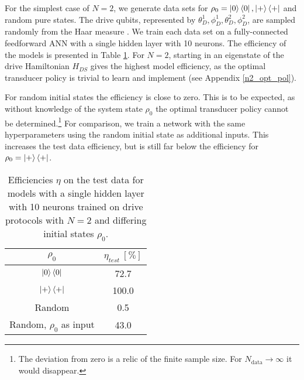 For the simplest case of $N = 2$, we generate data sets for $\rho_0 = \ket{0} \bra{0}, \ket{+} \bra{+}$ and random pure states.
The drive qubits, represented by $\theta_D^1, \phi_D^1, \theta_D^2, \phi_D^2$, are sampled randomly from the Haar measure \cite{Mezzadri}.
We train each data set on a fully-connected feedforward ANN with a single hidden layer with 10 neurons.
The efficiency of the models is presented in Table \ref{n2efftable}.
For $N = 2$, starting in an eigenstate of the drive Hamiltonian $H_{DS}$ gives the highest model efficiency, as the optimal transducer policy is trivial to learn and implement (see Appendix \ref{n2_opt_pol}).

For random initial states the efficiency is close to zero.
This is to be expected, as without knowledge of the system state $\rho_0$ the optimal transducer policy cannot be determined.\footnote{The deviation from zero is a relic of the finite sample size. For $N_{\mathrm{data}} \to \infty$ it would disappear.}
For comparison, we train a network with the same hyperparameters using the random initial state as additional inputs.
This increases the test data efficiency, but is still far below the efficiency for $\rho_0 = \ket{+} \bra{+}$.


\begin{table}[h]
	\centering
	\begin{tabular}{ c | c }
		$\rho_0$ & $\eta_{test} \ [\%]$ \\
		\hline
		$\ket{0} \bra{0}$ & 72.7 \\
		$\ket{+} \bra{+}$ & 100.0 \\
		Random & 0.5 \\
		Random, $\rho_0$ as input & 43.0 \\
	\end{tabular}
	\caption{Efficiencies $\eta$ on the test data for models with a single hidden layer with 10 neurons trained on drive protocols with $N = 2$ and differing initial states $\rho_0$.}
	\label{n2efftable}
\end{table}